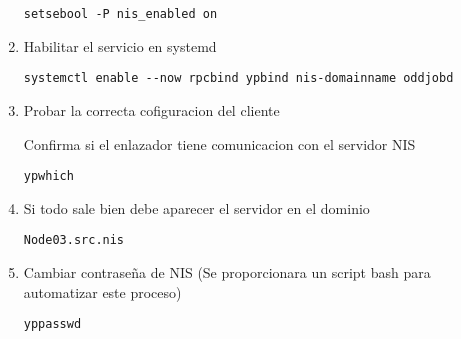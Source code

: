 \documentclass[../main.tex]{subfiles}
\begin{document}
\begin{enumerate}
\begin{lstlisting}
setsebool -P nis_enabled on 
\end{lstlisting}

\item Habilitar el servicio en systemd

  \begin{lstlisting}
systemctl enable --now rpcbind ypbind nis-domainname oddjobd
\end{lstlisting}

\item Probar la correcta cofiguracion del cliente

  Confirma si el enlazador tiene comunicacion con el servidor NIS

  \begin{lstlisting}
ypwhich
\end{lstlisting}
\item Si todo sale bien debe aparecer el servidor en el dominio
  \begin{lstlisting}
Node03.src.nis
\end{lstlisting}
\item Cambiar contraseña de NIS (Se proporcionara un
  script bash para automatizar este proceso)

  \begin{lstlisting}
yppasswd
\end{lstlisting}
  
\end{enumerate}
\end{document}
